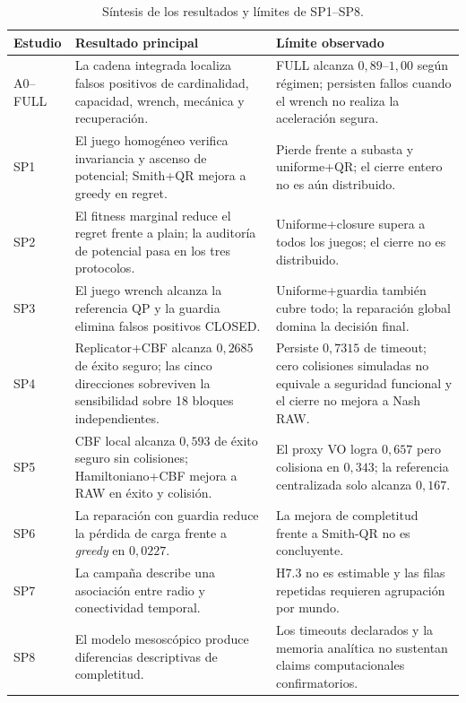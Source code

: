 \begin{table}[H]
\centering
\scriptsize
\begin{tabularx}{\textwidth}{@{}p{}p{}X@{}}
\toprule
Estudio & Resultado principal & Límite observado \\
\midrule
A0--FULL & La cadena integrada localiza falsos positivos de cardinalidad, capacidad, wrench, mecánica y recuperación. & FULL alcanza $0{,}89$--$1{,}00$ según régimen; persisten fallos cuando el wrench no realiza la aceleración segura. \\
SP1 & El juego homogéneo verifica invariancia y ascenso de potencial; Smith+QR mejora a greedy en regret. & Pierde frente a subasta y uniforme+QR; el cierre entero no es aún distribuido. \\
SP2 & El fitness marginal reduce el regret frente a plain; la auditoría de potencial pasa en los tres protocolos. & Uniforme+closure supera a todos los juegos; el cierre no es distribuido. \\
SP3 & El juego wrench alcanza la referencia QP y la guardia elimina falsos positivos CLOSED. & Uniforme+guardia también cubre todo; la reparación global domina la decisión final. \\
SP4 & Replicator+CBF alcanza $0{,}2685$ de \'exito seguro; las cinco direcciones sobreviven la sensibilidad sobre 18 bloques independientes. & Persiste $0{,}7315$ de timeout; cero colisiones simuladas no equivale a seguridad funcional y el cierre no mejora a Nash RAW. \\
SP5 & CBF local alcanza $0{,}593$ de éxito seguro sin colisiones; Hamiltoniano+CBF mejora a RAW en éxito y colisión. & El proxy VO logra $0{,}657$ pero colisiona en $0{,}343$; la referencia centralizada solo alcanza $0{,}167$. \\
SP6 & La reparación con guardia reduce la pérdida de carga frente a \emph{greedy} en $0{,}0227$. & La mejora de completitud frente a Smith-QR no es concluyente. \\
SP7 & La campaña describe una asociación entre radio y conectividad temporal. & H7.3 no es estimable y las filas repetidas requieren agrupación por mundo. \\
SP8 & El modelo mesoscópico produce diferencias descriptivas de completitud. & Los timeouts declarados y la memoria analítica no sustentan claims computacionales confirmatorios. \\
\bottomrule
\end{tabularx}
\caption{Síntesis de los resultados y límites de SP1--SP8.}
\label{tab:lectura-transversal-resultados}
\end{table}

